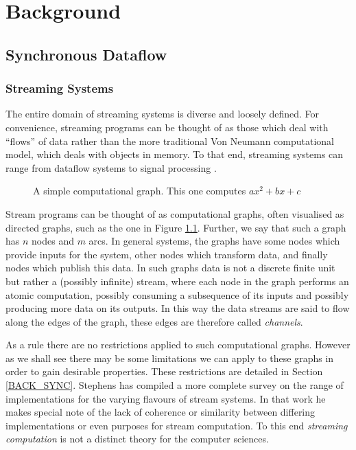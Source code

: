 \chapter{Background}
\label{chapBack}

\section{Synchronous Dataflow}

\subsection{Streaming Systems}
The entire domain of streaming systems is diverse and loosely defined.
For convenience, streaming programs can be thought of as those which deal with ``flows'' of data rather than the more traditional Von Neumann computational model, which deals with objects in memory.
To that end, streaming systems can range from dataflow systems \cite{gur85} to signal processing \cite{sdfBook}.

\begin{figure}
\begin{center}
	
\caption{A simple computational graph.  This one computes $ax^2 + bx + c$}
\label{figSimpleDG}
\end{center}
\end{figure}

Stream programs can be thought of as computational graphs, often visualised as directed graphs, such as the one in Figure \ref{figSimpleDG}.
Further, we say that such a graph has $n$ nodes and $m$ arcs.
In general systems, the graphs have some nodes which provide inputs for the system, other nodes which transform data, and finally nodes which publish this data.
In such graphs data is not a discrete finite unit but rather a (possibly infinite) stream, where each node in the graph performs an atomic computation, possibly consuming a subsequence of its inputs and possibly producing more data on its outputs.
In this way the data streams are said to flow along the edges of the graph, these edges are therefore called {\em channels}.

As a rule there are no restrictions applied to such computational graphs.
However as we shall see there may be some limitations we can apply to these graphs in order to gain desirable properties.
These restrictions are detailed in Section \ref{BACK_SYNC}.
Stephens has compiled a more complete survey \cite{ste97} on the range of implementations for the varying flavours of stream systems.
In that work he makes special note of the lack of coherence or similarity between differing implementations or even purposes for stream computation.
To this end {\em streaming computation} is not a distinct theory for the computer sciences.

